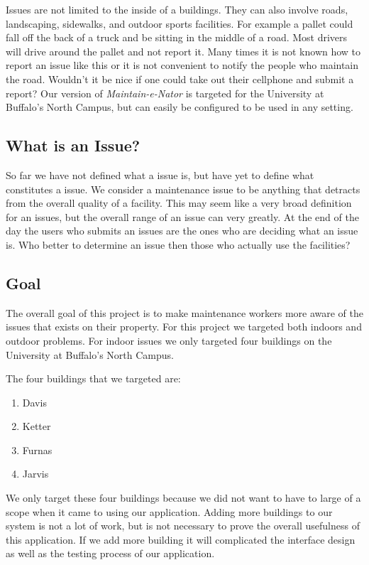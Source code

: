 \documentclass{acm_proc_article-sp}
\begin{document}
Issues are not limited to the inside of a buildings. They can also involve roads, landscaping, sidewalks, and outdoor sports facilities. For example a pallet could fall off the back of a truck and be sitting in the middle of a road. Most drivers will drive around the pallet and not report it. Many times it is not known how to report an issue like this or it is not convenient to notify the people who maintain the road. Wouldn't it be nice if one could take out their cellphone and submit a report? Our version of \textit{Maintain-e-Nator} is targeted for the University at Buffalo's North Campus, but can easily be configured to be used in any setting.

\subsection{What is an Issue?}
So far we have not defined what a issue is, but have yet to define what constitutes a issue. We consider a maintenance issue to be anything that detracts from the overall quality of a facility. This may seem like a very broad definition for an issues, but the overall range of an issue can very greatly. At the end of the day the users who submits an issues are the ones who are deciding what an issue is.  Who better to determine an issue then those who actually use the facilities?  

\subsection{Goal}
The overall goal of this project is to make maintenance workers more aware of the issues that exists on their property.
For this project we targeted both indoors and outdoor problems. For indoor issues we only targeted four buildings on the University at Buffalo's North Campus.

The four buildings that we targeted are:
\vspace{-4mm}
\begin{enumerate}[itemsep=0mm]
\item Davis
\item Ketter
\item Furnas
\item Jarvis
\end{enumerate}
\vspace{-2mm}

We only target these four buildings because we did not want to have to large of a scope when it came to using our application. Adding more buildings to our system is not a lot of work, but is not necessary to prove the overall usefulness of this application. If we add more building it will complicated the interface design as well as the testing process of our application.
\end{document}

